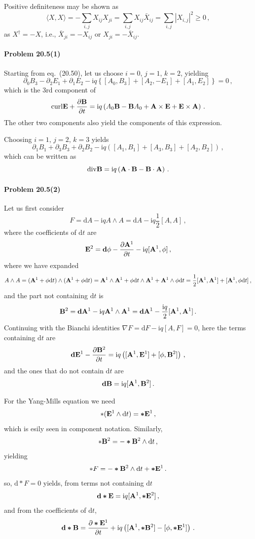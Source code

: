 \documentclass[a4paper,12pt]{article}
\def\d{\mathrm{d}}
\def\imagi{\mathrm{i}}
\newcommand{\problem}[1]{\paragraph{Problem #1}}
\begin{document}
Positive definiteness may be shown as
\[
 \langle X, X \rangle = -\sum_{i, j}X_{ij}X_{ji} = \sum_{i, j} X_{ij}\bar{X}_{ij} = \sum_{i, j}|X_{i, j}|^2 \ge 0\,,
\]
as $X^\dagger = -X$, i.e., $\bar{X}_{ji} = -X_{ij}$ or $X_{ji} = -\bar{X}_{ij}$.


\problem{20.5(1)} Starting from eq.\ (20.50), let us choose $i=0$, $j=1$, $k=2$, yielding
\[
 \partial_0 B_3 - \partial_2 E_1 + \partial_1 E_2 - \imagi q \left\{ [A_0, B_3] + [A_2, -E_1] + [A_1, E_2]\right\} = 0\,,
\]
which is the 3rd component of
\[
 {\rm curl}{\bf E} + \frac{\partial {\bf B}}{\partial t} = \imagi q \left( A_0 {\bf B} - {\bf B}A_0 + {\bf A}\times {\bf E} + {\bf E}\times{\bf A}\right)\,.
\]
The other two components also yield the components of this expression.

Choosing $i=1$, $j=2$, $k=3$ yields
\[
 \partial_1 B_1 + \partial_3 B_3 + \partial_2 B_2 -\imagi q \left( [A_1, B_1] + [A_3, B_3] + [A_2, B_2] \right)\,,
\]
which can be written as
\[
 {\rm div}{\bf B} = \imagi q \left( {\bf A}\cdot {\bf B} - {\bf B}\cdot{\bf A}\right)\,.
\]


\problem{20.5(2)} Let us first consider
\[
 F = \d A - \imagi q A\wedge A = \d A - \imagi q \frac{1}{2}[A, A]\,,
\]
where the coefficients of $\d t$ are
\[
 {\bf E}^2 = {\bf d}{\bf \phi} -\frac{\partial {\bf A}^1}{\partial t} - \imagi q [{\bf A}^1, \phi]\,,
\]
where we have expanded
\[
 A \wedge A = ({\bf A}^1 + \phi \d t )\wedge ({\bf A}^1 + \phi \d t ) = {\bf A}^1\wedge {\bf A}^1 + \phi\d t \wedge {\bf A}^1 + {\bf A}^1\wedge \phi\d t = \frac{1}{2}[{\bf A}^1, {\bf A}^1] +[{\bf A}^1, \phi \d t]\,,
\]
and the part not containing $\d t$ is
\[
 {\bf B}^2 = {\bf d}{\bf A}^1 -\imagi q {\bf A}^1\wedge {\bf A}^1 = {\bf d}{\bf A}^1 -\frac{\imagi q}{2}[{\bf A}^1, {\bf A}^1]\,.
\]
Continuing with the Bianchi identities $\nabla F = \d F -\imagi q [A, F] = 0$, here the terms containing $\d t$ are
\[
 {\bf d}{\bf E}^1 -\frac{\partial {\bf B}^2}{\partial t} = \imagi q \left( [{\bf A}^1, {\bf E}^1] + [\phi, {\bf B}^2]\right)\,,
\]
and the ones that do not contain $\d t$ are
\[
 {\bf d}{\bf B} = \imagi q [{\bf A}^1, {\bf B}^2]\,.
\]

For the Yang-Mills equation we need
\[
 *({\bf E}^1\wedge \d t) = \boldsymbol{*}{\bf E}^1\,,
\]
which is esily seen in component notation. Similarly,
\[
 *{\bf B}^2 = -\boldsymbol{*}{\bf B}^2 \wedge \d t\,,
\]
yielding
\[
 *F = -\boldsymbol{*}{\bf B}^2\wedge \d t + \boldsymbol{*}{\bf E}^1\,.
\]
so, $\d*F = 0$ yields, from terms not containing $\d t$
\[
 {\bf d}\boldsymbol{*}{\bf E} = \imagi q [{\bf A}^1, \boldsymbol{*}{\bf E}^2]\,,
\]
and from the coefficients of $\d t$,
\[
 {\bf d}\boldsymbol{*}{\bf B} = \frac{\partial\boldsymbol{*}{\bf E}^1}{\partial t} +\imagi q\left([{\bf A}^1, \boldsymbol{*}{\bf B}^2] -[\phi, \boldsymbol{*}{\bf E}^1]\right)\,.
\]
\end{document}
